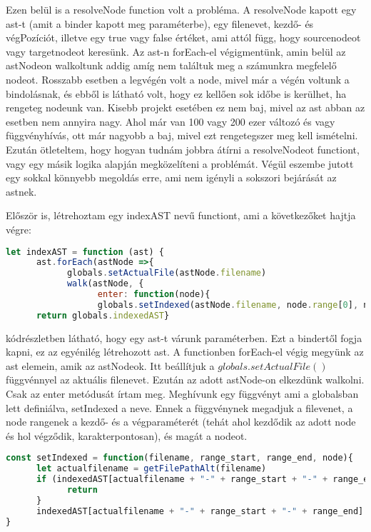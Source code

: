 Ezen belül is a resolveNode function volt a probléma.
A resolveNode kapott egy ast-t (amit a binder kapott meg paraméterbe), egy filenevet, kezdő- és végPozíciót, illetve egy true vagy false értéket, ami attól függ, hogy sourcenodeot vagy targetnodeot keresünk.
Az ast-n forEach-el végigmentünk, amin belül az astNodeon walkoltunk addig amíg nem találtuk meg a számunkra megfelelő nodeot.
Rosszabb esetben a legvégén volt a node, mivel már a végén voltunk a bindolásnak, és ebből is látható volt, hogy ez kellően sok időbe is kerülhet, ha rengeteg nodeunk van.
Kisebb projekt esetében ez nem baj, mivel az ast abban az esetben nem annyira nagy.
Ahol már van 100 vagy 200 ezer változó és vagy függvényhívás, ott már nagyobb a baj, mivel ezt rengetegszer meg kell ismételni.
Ezután ötleteltem, hogy hogyan tudnám jobbra átírni a resolveNodeot functiont, vagy egy másik logika alapján megközelíteni a problémát.
Végül eszembe jutott egy sokkal könnyebb megoldás erre, ami nem igényli a sokszori bejárását az astnek.
\noindent

Először is, létrehoztam egy indexAST nevű functiont, ami a következőket hajtja végre:

\begin{lstlisting}[caption={indexAST function}, label={lst:indexAST_function}, language={JavaScript}]
let indexAST = function (ast) {
      ast.forEach(astNode =>{
            globals.setActualFile(astNode.filename)
            walk(astNode, {
                  enter: function(node){
                  globals.setIndexed(astNode.filename, node.range[0], node.range[1], node)}})})
      return globals.indexedAST}
\end{lstlisting}

 kódrészletben látható, hogy egy ast-t várunk paraméterben. Ezt a bindertől fogja kapni, ez az egyénilég létrehozott ast.
A functionben forEach-el végig megyünk az ast elemein, amik az astNodeok. Itt beállítjuk a ${globals.setActualFile()}$ függvénnyel az aktuális filenevet.
Ezután az adott astNode-on elkezdünk walkolni. Csak az enter metódusát írtam meg. Meghívunk egy függvényt ami a globalsban lett definiálva, setIndexed a neve.
Ennek a függvénynek megadjuk a filevenet, a node rangenek a kezdő- és a végparaméterét (tehát ahol kezdődik az adott node és hol végződik, karakterpontosan), és magát a nodeot.

\begin{lstlisting}[caption={setIndexed function}, label={lst:setIndexed_function}, language={JavaScript}]
const setIndexed = function(filename, range_start, range_end, node){
      let actualfilename = getFilePathAlt(filename)
      if (indexedAST[actualfilename + "-" + range_start + "-" + range_end] !== undefined && indexedAST[actualfilename + "-" + range_start + "-" + range_end] !== node){
            return
      }
      indexedAST[actualfilename + "-" + range_start + "-" + range_end] = node
}
\end{lstlisting}

